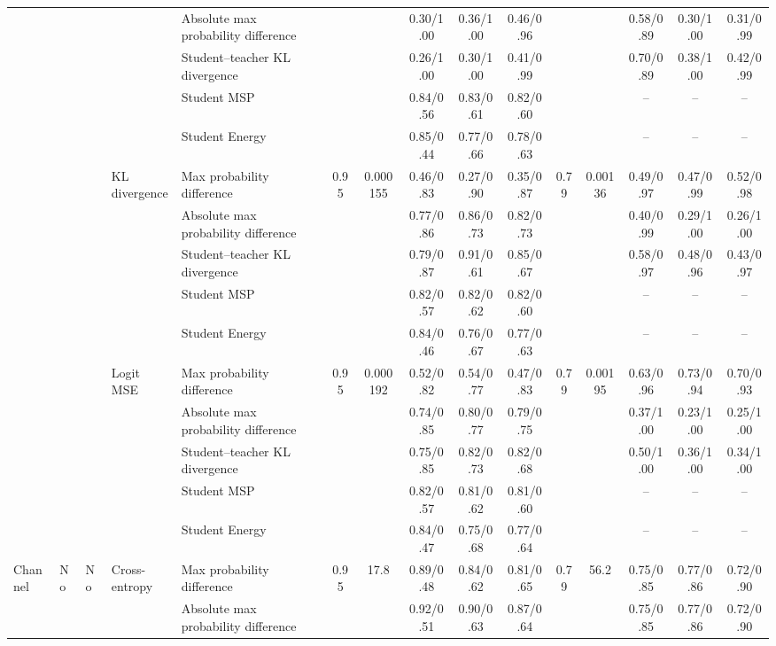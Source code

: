 \documentclass[border=2pt]{standalone}
\begin{document}
\begin{tabular}{lllllcccccccccc}
 &  &  &  & Absolute max probability difference &  &  & 0.30/1.00 & 0.36/1.00 & 0.46/0.96 &  &  & 0.58/0.89 & 0.30/1.00 & 0.31/0.99 \\
 &  &  &  & Student--teacher KL divergence &  &  & 0.26/1.00 & 0.30/1.00 & 0.41/0.99 &  &  & 0.70/0.89 & 0.38/1.00 & 0.42/0.99 \\
 &  &  &  & Student MSP &  &  & 0.84/0.56 & 0.83/0.61 & 0.82/0.60 &  &  & -- & -- & -- \\
 &  &  &  & Student Energy &  &  & 0.85/0.44 & 0.77/0.66 & 0.78/0.63 &  &  & -- & -- & -- \\
 &  &  & KL divergence & Max probability difference & 0.95 & 0.000155 & 0.46/0.83 & 0.27/0.90 & 0.35/0.87 & 0.79 & 0.00136 & 0.49/0.97 & 0.47/0.99 & 0.52/0.98 \\
 &  &  &  & Absolute max probability difference &  &  & 0.77/0.86 & 0.86/0.73 & 0.82/0.73 &  &  & 0.40/0.99 & 0.29/1.00 & 0.26/1.00 \\
 &  &  &  & Student--teacher KL divergence &  &  & 0.79/0.87 & 0.91/0.61 & 0.85/0.67 &  &  & 0.58/0.97 & 0.48/0.96 & 0.43/0.97 \\
 &  &  &  & Student MSP &  &  & 0.82/0.57 & 0.82/0.62 & 0.82/0.60 &  &  & -- & -- & -- \\
 &  &  &  & Student Energy &  &  & 0.84/0.46 & 0.76/0.67 & 0.77/0.63 &  &  & -- & -- & -- \\
 &  &  & Logit MSE & Max probability difference & 0.95 & 0.000192 & 0.52/0.82 & 0.54/0.77 & 0.47/0.83 & 0.79 & 0.00195 & 0.63/0.96 & 0.73/0.94 & 0.70/0.93 \\
 &  &  &  & Absolute max probability difference &  &  & 0.74/0.85 & 0.80/0.77 & 0.79/0.75 &  &  & 0.37/1.00 & 0.23/1.00 & 0.25/1.00 \\
 &  &  &  & Student--teacher KL divergence &  &  & 0.75/0.85 & 0.82/0.73 & 0.82/0.68 &  &  & 0.50/1.00 & 0.36/1.00 & 0.34/1.00 \\
 &  &  &  & Student MSP &  &  & 0.82/0.57 & 0.81/0.62 & 0.81/0.60 &  &  & -- & -- & -- \\
 &  &  &  & Student Energy &  &  & 0.84/0.47 & 0.75/0.68 & 0.77/0.64 &  &  & -- & -- & -- \\
\addlinespace
Channel & No & No & Cross-entropy & Max probability difference & 0.95 & 17.8 & 0.89/0.48 & 0.84/0.62 & 0.81/0.65 & 0.79 & 56.2 & 0.75/0.85 & 0.77/0.86 & 0.72/0.90 \\
 &  &  &  & Absolute max probability difference &  &  & 0.92/0.51 & 0.90/0.63 & 0.87/0.64 &  &  & 0.75/0.85 & 0.77/0.86 & 0.72/0.90 \\

\end{tabular}
\end{document}
